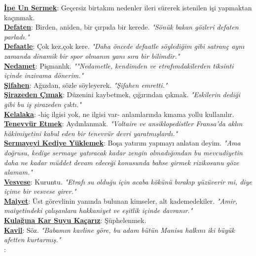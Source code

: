 \documentclass[twocolumn]{article}
\begin{document}
\noindent \underline{\textbf{İpe Un Sermek}}:\textsf{ Geçersiz birtakım nedenler ileri sürerek istenilen işi yapmaktan kaçınmak. }\textit{ } \\
\noindent \underline{\textbf{Defaten}}:\textsf{ Birden, aniden, bir çırpıda bir kerede. }\textit{"Sönük bakan gözleri defaten parladı."} \\
\noindent \underline{\textbf{Defaatle}}:\textsf{ Çok kez,çok kere. }\textit{"Daha öncede defaatle söylediğim gibi satranç aynı zamanda dinamik bir spor olmanın yanı sıra bir bilimdir."} \\
\noindent \underline{\textbf{Nedamet}}:\textsf{ Pişmanlık. }\textit{""Nedametle, kendimden ve etrafımdakilerden tiksinti içinde inzivama dönerim."} \\
\noindent \underline{\textbf{Şifahen}}:\textsf{ Ağızdan, sözle söyleyerek. }\textit{"Şifahen emretti."} \\
\noindent \underline{\textbf{Şirazeden Çımak}}:\textsf{ Düzenini kaybetmek, çığırından çıkmak. }\textit{"Eskilerin dediği gibi bu iş şirazeden çıktı."} \\
\noindent \underline{\textbf{Kelalaka}}:\textsf{ -hiç ilgisi yok, ne ilgisi var- anlamlarında kınama yollu kullanılır. }\textit{ } \\
\noindent \underline{\textbf{Tenevvür Etmek}}:\textsf{ Aydınlanmak. }\textit{"Voltaire ve ansiklopedistler Fransa'da aklın hâkimiyetini kabul eden bir tenevvür devri yaratmışlardı."} \\
\noindent \underline{\textbf{Sermayeyi Kediye Yüklemek}}:\textsf{ Boşa yatırım yapmayı anlatan deyim. }\textit{"Ama doğrusu, kediye sermaye yatıracak kadar zengin olmadığımdan bu mevcudiyetin daha ne kadar müddet devam edeceği konusunda bahse girmek rizikosunu göze alamam."} \\
\noindent \underline{\textbf{Vesvese}}:\textsf{ Kuruntu. }\textit{"Etrafı su olduğu için acaba kökünü bırakıp yüzüverir mi, diye içime bir vesvese girer."} \\
\noindent \underline{\textbf{Maiyet}}:\textsf{ Üst görevlinin yanında bulunan kimseler, alt kademedekiler. }\textit{"Amir, maiyetindeki çalışanlara hakkaniyet ve eşitlik içinde davranır."} \\
\noindent \underline{\textbf{Kulağına Kar Suyu Kaçarız}}:\textsf{ Şüphelenmek. }\textit{ } \\
\noindent \underline{\textbf{Kavil}}:\textsf{ Söz. }\textit{"Babamın kavline göre, bu adam bütün Manisa halkını iki büyük afetten kurtarmış."} \\
\noindent \underline{\textbf{ }}:\textsf{ }\textit{ } \\
\end{document}
